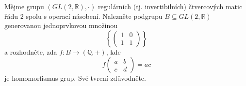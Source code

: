 Mějme grupu $(GL(2,\mathbb{R}), \cdot)$ regulárních (tj. invertibilních) čtvercových matic řádu 2
spolu s operací násobení. Nalezněte podgrupu $B\subseteq GL(2,\mathbb{R})$
generovanou jednoprvkovou množinou 
$$\left \{ \begin{pmatrix}
 1& 0\\ 
 1&1 
\end{pmatrix} \right \}$$
a rozhodněte, zda $f:B \rightarrow (\mathbb{Q}, +)$, kde 
$$f\begin{pmatrix}
 a&b\\ 
 c&d 
\end{pmatrix} =ac$$ je homomorfismus grup. Své tvrení zdůvodněte.
